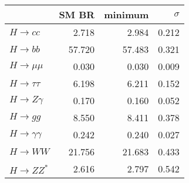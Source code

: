 \begin{tabular}{lrrr}
\toprule
{} &  SM BR &  minimum &  $\sigma$ \\
\midrule
$H\to cc$           &  2.718 &    2.984 &     0.212 \\
$H\to bb$           & 57.720 &   57.483 &     0.321 \\
$H\to \mu\mu$       &  0.030 &    0.030 &     0.009 \\
$H\to \tau\tau$     &  6.198 &    6.211 &     0.152 \\
$H\to Z\gamma$      &  0.170 &    0.160 &     0.052 \\
$H\to gg$           &  8.550 &    8.411 &     0.378 \\
$H\to \gamma\gamma$ &  0.242 &    0.240 &     0.027 \\
$H\to WW$           & 21.756 &   21.683 &     0.433 \\
$H\to ZZ^*$         &  2.616 &    2.797 &     0.542 \\
\bottomrule
\end{tabular}
